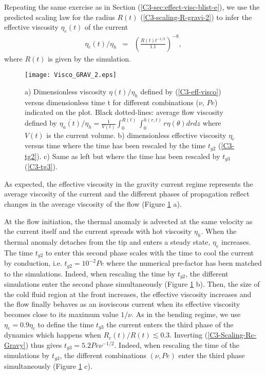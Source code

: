 Repeating      the      same      exercise     as      in      Section
(\ref{C3-sec:effect-visc-blist-e}), we  use the predicted  scaling law
for  the  radius  $R(t)$  (\ref{C3-scaling-R-gravi-2})  to  infer  the
effective viscosity $\eta_e(t)$ of the current
\begin{eqnarray}
  \eta_e(t)/\eta_h&=& \left(\frac{R(t)t^{-1/2}}{1.1}\right)^{-8},\label{C3-eff-visco-grav}
\end{eqnarray}
where $R(t)$ is given by the simulation.
\begin{figure}[h!]
  \begin{center}
    \graphicspath{ {/Users/thorey/Documents/These/Projet/Refroidissement/Skin_Model/Figure/JFM_V13/} }
    \texttt{[image: Visco\_GRAV\_2.eps]}
    \caption{a)  Dimensionless viscosity  $\eta(t)/\eta_h$ defined  by
      (\ref{C3-eff-visco}) versus  dimensionless time t  for different
      combinations  ($\nu$,  $Pe$)  indicated   on  the  plot.   Black
      dotted-lines:    average     flow    viscosity     defined    by
      $\overline{\eta_a(t)}/\eta_h                                   =
      \frac{1}{V(t)}\int_0^{R(t)}\int_0^{h(r,t)} r \eta(\theta) dr dz$
      where $V(t)$ is the  current volume.  b) dimensionless effective
      viscosity $\eta_e$ versus time where  the time has been rescaled
      by the time $t_{g2}$ (\ref{C3-tg2}).   c) Same as left but where
      the time has been rescaled by $t_{g3}$ (\ref{C3-tg3}). }
    \label{C3-Visco_GRAV_2}
  \end{center}
\end{figure}

As expected,  the effective  viscosity in  the gravity  current regime
represents  the average  viscosity of  the current  and the  different
phases of propagation reflect changes  in the average viscosity of the
flow (Figure \ref{C3-Visco_GRAV_2} a).

At the  flow initiation, the thermal  anomaly is advected at  the same
velocity  as the  current  itself  and the  current  spreads with  hot
viscosity $\eta_h$. When the thermal anomaly detaches from the tip and
enters a steady state, $\eta_e$ increases.  The time $t_{g2}$ to enter
this  second  phase scales  with  the  time  to  cool the  current  by
conduction,  i.e.  $t_{g2}=10^{-2}Pe$  where the  numerical pre-factor
has been matched to the  simulations.  Indeed, when rescaling the time
by  $t_{g2}$,  the  different   simulations  enter  the  second  phase
simultaneously (Figure  \ref{C3-Visco_GRAV_2} b).   Then, the  size of
the cold fluid region at  the front increases, the effective viscosity
increases and the  flow finally behaves as an  isoviscous current when
its effective  viscosity becomes close  to its maximum  value $1/\nu$.
As in  the bending regime, we  use $\eta_e = 0.9\eta_c$  to define the
time $t_{g3}$ the current enters the third phase of the dynamics which
happens        when        $R_c(t)/R(t)\lesssim0.3$.         Inverting
(\ref{C3-Scaling-Rc-Gravy})   thus   gives   $t_{g3}=5.2Pe\nu^{-1/2}$.
Indeed, when  rescaling the time  of the simulations by  $t_{g3}$, the
different combinations $(\nu,Pe)$ enter the third phase simultaneously
(Figure \ref{C3-Visco_GRAV_2} c).

